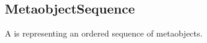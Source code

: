 \subsection{MetaobjectSequence}
\label{concept-MetaobjectSequence}

A  is representing an ordered sequence of metaobjects.





